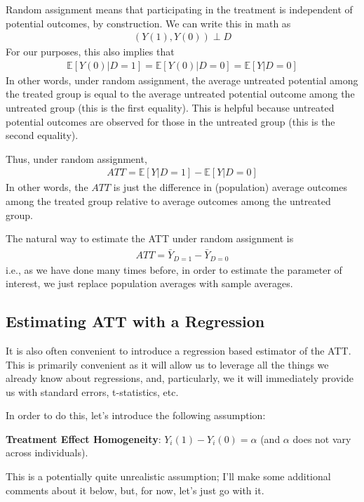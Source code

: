 \documentclass[
  letterpaper,
  DIV=11,
  numbers=noendperiod]{scrreprt}
\begin{document}
Random assignment means that participating in the treatment is
independent of potential outcomes, by construction. We can write this in
math as \begin{align*}
  (Y(1), Y(0)) \perp D
\end{align*} For our purposes, this also implies that \begin{align*}
  \mathbb{E}[Y(0)|D=1] = \mathbb{E}[Y(0)|D=0] = \mathbb{E}[Y|D=0]
\end{align*} In other words, under random assignment, the average
untreated potential among the treated group is equal to the average
untreated potential outcome among the untreated group (this is the first
equality). This is helpful because untreated potential outcomes are
observed for those in the untreated group (this is the second equality).

Thus, under random assignment, \begin{align*}
  ATT = \mathbb{E}[Y|D=1] - \mathbb{E}[Y|D=0]
\end{align*} In other words, the \(ATT\) is just the difference in
(population) average outcomes among the treated group relative to
average outcomes among the untreated group.

The natural way to estimate the ATT under random assignment is
\begin{align*}
  \widehat{ATT} = \bar{Y}_{D=1} - \bar{Y}_{D=0}
\end{align*} i.e., as we have done many times before, in order to
estimate the parameter of interest, we just replace population averages
with sample averages.

\subsection{Estimating ATT with a
Regression}\label{estimating-att-with-a-regression}

It is also often convenient to introduce a regression based estimator of
the ATT. This is primarily convenient as it will allow us to leverage
all the things we already know about regressions, and, particularly, we
it will immediately provide us with standard errors, t-statistics, etc.

In order to do this, let's introduce the following assumption:

\textbf{Treatment Effect Homogeneity}: \(Y_i(1) - Y_i(0) = \alpha\) (and
\(\alpha\) does not vary across individuals).

This is a potentially quite unrealistic assumption; I'll make some
additional comments about it below, but, for now, let's just go with it.
\end{document}
